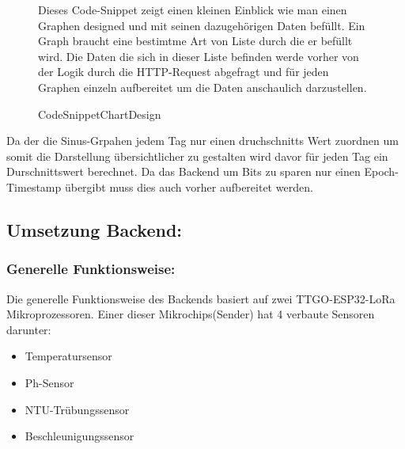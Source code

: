 \begin{figure}[h!]
\begin{minipage}[c]{0.5\textwidth}
\caption{CodeSnippetChartDesign}
\end{minipage}
\begin{minipage}[c]{0.5\textwidth}
    \label{fig:CodeSnippetGraph}
    Dieses Code-Snippet zeigt einen kleinen Einblick wie man einen Graphen designed und mit seinen dazugehörigen 
    Daten befüllt. Ein Graph braucht eine bestimtme Art von Liste durch die er befüllt wird. Die Daten 
    die sich in dieser Liste befinden werde vorher von der Logik durch die HTTP-Request abgefragt und für jeden Graphen einzeln
    aufbereitet um die Daten anschaulich darzustellen.
\end{minipage}
\end{figure}
\newline 
Da der die Sinus-Grpahen jedem Tag nur einen druchschnitts Wert zuordnen um somit die Darstellung übersichtlicher
zu gestalten wird davor für jeden Tag ein Durschnittswert berechnet. Da das Backend um Bits zu sparen nur einen Epoch-Timestamp übergibt
muss dies auch vorher aufbereitet werden.


\newpage
\subsection*{Umsetzung Backend:}
\subsubsection*{Generelle Funktionsweise:}
Die generelle Funktionsweise des Backends basiert auf zwei TTGO-ESP32-LoRa  \newline Mikroprozessoren. 
Einer dieser Mikrochips(Sender) hat 4 verbaute Sensoren darunter:

\begin{itemize}
  \item Temperatursensor
  \item Ph-Sensor
  \item NTU-Trübungssensor
  \item Beschleunigungssensor  
\end{itemize}

